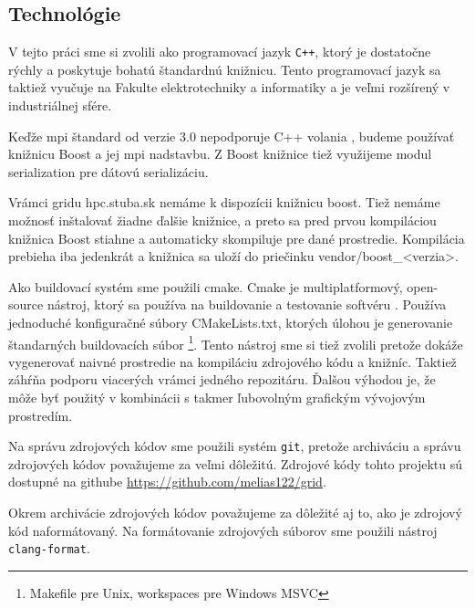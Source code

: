 \subsection{Technológie}
V tejto práci sme si zvolili ako programovací jazyk \texttt{C++}, ktorý je dostatočne rýchly a poskytuje bohatú štandardnú knižnicu.
Tento programovací jazyk sa taktiež vyučuje na Fakulte elektrotechniky a informatiky a je veľmi rozšírený v industriálnej sfére.

Keďže \acrshort{mpi} štandard od verzie 3.0 nepodporuje C++ volania \cite{mpi3-1},
budeme používať knižnicu Boost a jej \acrshort{mpi} nadstavbu. Z Boost knižnice tiež využijeme modul serialization pre dátovú serializáciu.

Vrámci gridu hpc.stuba.sk nemáme k dispozícii knižnicu boost. Tiež nemáme možnosť inštalovať žiadne ďalšie knižnice,
a preto sa pred prvou kompiláciou knižnica Boost stiahne a automaticky skompiluje pre dané prostredie.
Kompilácia prebieha iba jedenkrát a knižnica sa uloží do priečinku vendor/boost\_<verzia>.

Ako buildovací systém sme použili cmake.
Cmake je multiplatformový, open-source nástroj, ktorý sa používa na buildovanie a testovanie softvéru \cite{cmake-doc}.
Používa jednoduché konfiguračné súbory CMakeLists.txt, ktorých úlohou je generovanie štandarných buildovacích súbor \footnote{Makefile pre Unix, workspaces pre Windows MSVC}. Tento nástroj sme si tiež zvolili pretože dokáže vygenerovať naivné prostredie na kompiláciu zdrojového kódu a knižníc.
Taktiež záhŕňa podporu viacerých  vrámci jedného repozitáru.
Ďalšou výhodou je, že môže byť použitý v kombinácii s takmer ľubovolným grafickým vývojovým prostredím.

Na správu zdrojových kódov sme použili systém \texttt{git}, pretože archiváciu a správu zdrojových kódov považujeme za veľmi dôležitú.
Zdrojové kódy tohto projektu sú dostupné na githube \url{https://github.com/melias122/grid}.

Okrem archivácie zdrojových kódov považujeme za dôležité aj to, ako je zdrojový kód naformátovaný.
Na formátovanie zdrojových súborov sme použili nástroj \texttt{clang-format}.

